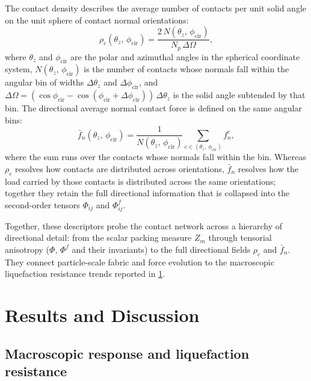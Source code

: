 \documentclass[a4paper,fleqn]{cas-sc}
\newcommand{\Zm}{\ensuremath{Z_m}}
\begin{document}
The contact density \citep{Han2023} describes the average number of contacts per unit solid angle on the unit sphere of contact normal orientations:
\begin{equation}
\rho_c(\theta_z,\,\phi_{\mathrm{cir}}) = \frac{2\,N(\theta_z,\,\phi_{\mathrm{cir}})}{N_p\,\Delta\Omega},
\label{eq:contact_density}
\end{equation}
where $\theta_z$ and $\phi_{\mathrm{cir}}$ are the polar and azimuthal angles in the spherical coordinate system, $N(\theta_z,\,\phi_{\mathrm{cir}})$ is the number of contacts whose normals fall within the angular bin of widths $\Delta\theta_z$ and $\Delta\phi_{\mathrm{cir}}$, and $\Delta\Omega = (\cos\phi_{\mathrm{cir}} - \cos(\phi_{\mathrm{cir}}+\Delta\phi_{\mathrm{cir}}))\,\Delta\theta_z$ is the solid angle subtended by that bin. The directional average normal contact force is defined on the same angular bins:
\begin{equation}
\bar{f}_n(\theta_z,\,\phi_{\mathrm{cir}}) = \frac{1}{N(\theta_z,\,\phi_{\mathrm{cir}})} \sum_{c \in (\theta_z,\,\phi_{\mathrm{cir}})} f_n^c,
\label{eq:fn_directional}
\end{equation}
where the sum runs over the contacts whose normals fall within the bin. Whereas $\rho_c$ resolves how contacts are distributed across orientations, $\bar{f}_n$ resolves how the load carried by those contacts is distributed across the same orientations; together they retain the full directional information that is collapsed into the second-order tensors $\Phi_{ij}$ and $\Phi^f_{ij}$.

Together, these descriptors probe the contact network across a hierarchy of directional detail: from the scalar packing measure \Zm{} through tensorial anisotropy ($\Phi$, $\Phi^f$ and their invariants) to the full directional fields $\rho_c$ and $\bar{f}_n$. They connect particle-scale fabric and force evolution to the macroscopic liquefaction resistance trends reported in \cref{sec:results}.

\section{Results and Discussion}
\label{sec:results}

\subsection{Macroscopic response and liquefaction resistance}
\label{subsec:macro_response}
\end{document}
